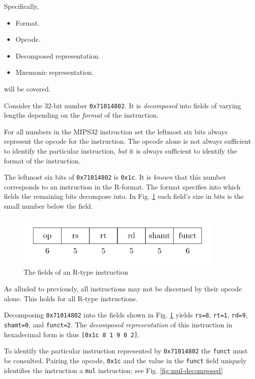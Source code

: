 Specifically,

\begin{itemize}
  \item Format.
  \item Opcode.
  \item Decomposed representation.
  \item Mnemonic representation.
\end{itemize}

will be covered.

Consider the 32-bit number \texttt{0x71014802}. It is \emph{decomposed}
into fields of varying lengths depending on the \emph{format} of the
instruction.

For all numbers in the MIPS32 instruction set the leftmost six bits
always represent the opcode for the instruction. The opcode alone is
not always sufficient to identify the particular instruction,
\emph{but} it is always sufficient to identify the format of the
instruction.

The leftmost six bits of \texttt{0x71014802} is \texttt{0x1c}. It is
\emph{known} that this number corresponds to an instruction in the
R-format. The format specifies into which fields the remaining bits
decompose into. In Fig. \ref{fig:r-decomposed} each field's size in
bits is the small number below the field.

\begin{figure}[H]
  \centering
  \includegraphics[width=0.9\textwidth]{figures/r-decomposed.png}
  \caption{The fields of an R-type instruction}
  \label{fig:r-decomposed}
\end{figure}

As alluded to previously, all instructions may not be discerned by
their opcode alone. This holds for all R-type instructions.

Decomposing \texttt{0x71014802} into the fields shown in
Fig. \ref{fig:r-decomposed} yields \texttt{rs=8}, \texttt{rt=1},
\texttt{rd=9}, \texttt{shamt=0}, and \texttt{funct=2}. The
\emph{decomposed representation} of this instruction in hexadecimal
form is thus \texttt{[0x1c 8 1 9 0 2]}. 

To identify the particular instruction represented by
\texttt{0x71014802} the \texttt{funct} must be consulted. Pairing the
opcode, \texttt{0x1c} and the value in the \texttt{funct} field
uniquely identifies the instruction a \texttt{mul} instruction; see
Fig. \ref{fig:mul-decomposed}

